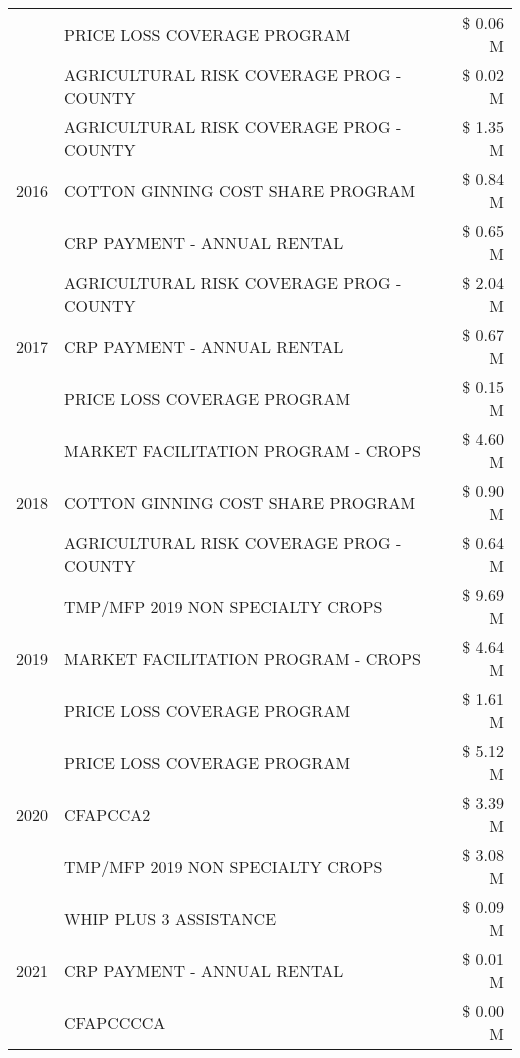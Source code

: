 \begin{tabular}{llr}
 & PRICE LOSS COVERAGE PROGRAM & \$ 0.06 M \\
 & AGRICULTURAL RISK COVERAGE PROG - COUNTY & \$ 0.02 M \\
\cline{1-3}
\multirow[t]{3}{*}{2016} & AGRICULTURAL RISK COVERAGE PROG - COUNTY & \$ 1.35 M \\
 & COTTON GINNING COST SHARE PROGRAM & \$ 0.84 M \\
 & CRP PAYMENT - ANNUAL RENTAL & \$ 0.65 M \\
\cline{1-3}
\multirow[t]{3}{*}{2017} & AGRICULTURAL RISK COVERAGE PROG - COUNTY & \$ 2.04 M \\
 & CRP PAYMENT - ANNUAL RENTAL & \$ 0.67 M \\
 & PRICE LOSS COVERAGE PROGRAM & \$ 0.15 M \\
\cline{1-3}
\multirow[t]{3}{*}{2018} & MARKET FACILITATION PROGRAM - CROPS & \$ 4.60 M \\
 & COTTON GINNING COST SHARE PROGRAM & \$ 0.90 M \\
 & AGRICULTURAL RISK COVERAGE PROG - COUNTY & \$ 0.64 M \\
\cline{1-3}
\multirow[t]{3}{*}{2019} & TMP/MFP 2019 NON SPECIALTY CROPS & \$ 9.69 M \\
 & MARKET FACILITATION PROGRAM - CROPS & \$ 4.64 M \\
 & PRICE LOSS COVERAGE PROGRAM & \$ 1.61 M \\
\cline{1-3}
\multirow[t]{3}{*}{2020} & PRICE LOSS COVERAGE PROGRAM & \$ 5.12 M \\
 & CFAPCCA2 & \$ 3.39 M \\
 & TMP/MFP 2019 NON SPECIALTY CROPS & \$ 3.08 M \\
\cline{1-3}
\multirow[t]{3}{*}{2021} & WHIP PLUS 3 ASSISTANCE & \$ 0.09 M \\
 & CRP PAYMENT - ANNUAL RENTAL & \$ 0.01 M \\
 & CFAPCCCCA & \$ 0.00 M \\
\cline{1-3}
\bottomrule
\end{tabular}
